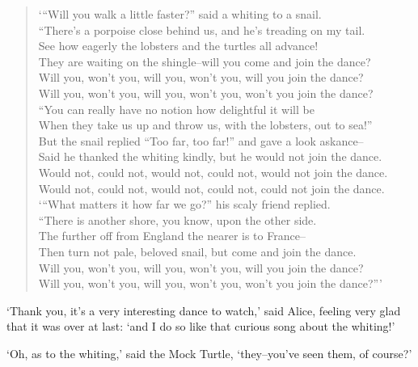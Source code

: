 \documentclass[12pt]{book}
\begin{document}
\begin{verse}
`{}``Will you walk a little faster?'' said a whiting to a snail. \\
``There's a porpoise close behind us, and he's treading on my tail.\\
See how eagerly the lobsters and the turtles all advance!\\
They are waiting on the shingle--will you come and join the dance?\\

Will you, won't you, will you, won't you, will you join the dance?\\
Will you, won't you, will you, won't you, won't you join the dance?\\

``You can really have no notion how delightful it will be\\
When they take us up and throw us, with the lobsters, out to sea!''\\

But the snail replied ``Too far, too far!'' and gave a look askance-- \\

Said he thanked the whiting kindly, but he would not join the dance.\\
    Would not, could not, would not, could not, would not join the dance.\\
    Would not, could not, would not, could not, could not join the dance.\\

`{}``What matters it how far we go?'' his scaly friend replied.\\
``There is another shore, you know, upon the other side.\\
The further off from England the nearer is to France--\\
Then turn not pale, beloved snail, but come and join the dance.\\

    Will you, won't you, will you, won't you, will you join the dance?\\
    Will you, won't you, will you, won't you, won't you join the dance?'''
\end{verse}

  `Thank you, it's a very interesting dance to watch,' said
Alice, feeling very glad that it was over at last:  `and I do so
like that curious song about the whiting!'

  `Oh, as to the whiting,' said the Mock Turtle, `they--you've
seen them, of course?'
\end{document}
